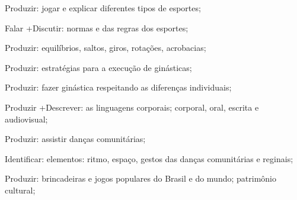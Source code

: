  Produzir: jogar e explicar diferentes tipos de esportes;

 Falar +Discutir: normas e das regras dos esportes;

 Produzir: equilíbrios, saltos, giros, rotações, acrobacias;

 Produzir: estratégias para a execução de ginásticas; 

 Produzir: fazer ginástica respeitando as diferenças individuais;

 Produzir +Descrever: as linguagens corporais; corporal, oral, escrita e audiovisual;

 Produzir: assistir danças comunitárias; 

 Identificar: elementos: ritmo, espaço, gestos das danças comunitárias e reginais;

 Produzir: brincadeiras e jogos populares do Brasil e do mundo; patrimônio cultural;


